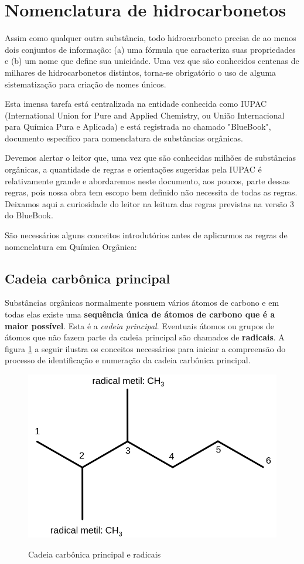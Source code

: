 \section{Nomenclatura de hidrocarbonetos}
Assim como qualquer outra substância, todo hidrocarboneto precisa de ao menos dois conjuntos de informação: (a) uma fórmula que caracteriza suas propriedades e (b) um nome que define sua unicidade. Uma vez que são conhecidos centenas de milhares de hidrocarbonetos distintos, torna-se obrigatório o uso de alguma sistematização para criação de nomes únicos.

Esta imensa tarefa está centralizada na entidade conhecida como IUPAC (International Union for Pure and Applied Chemistry, ou União Internacional para Química Pura e Aplicada) e está registrada no chamado "BlueBook", documento específico para nomenclatura de substâncias orgânicas.

Devemos alertar o leitor que, uma vez que são conhecidas milhões de substâncias orgânicas, a quantidade de regras e orientações sugeridas pela IUPAC é relativamente grande e abordaremos neste documento, aos poucos, parte dessas regras, pois nossa obra tem escopo bem definido não necessita de todas as regras. Deixamos aqui a curiosidade do leitor na leitura das regras previstas na versão 3 do BlueBook.

São necessários alguns conceitos introdutórios antes de aplicarmos as regras de nomenclatura em Química Orgânica:

\subsection{Cadeia carbônica principal}
Substâncias orgânicas normalmente possuem vários átomos de carbono e em todas elas existe uma \textbf{sequência única de átomos de carbono que é a maior possível}. Esta é a \emph{cadeia principal}. Eventuais átomos ou grupos de átomos que não fazem parte da cadeia principal são chamados de \textbf{radicais}. A figura \ref{fig:23} a seguir ilustra os conceitos necessários para iniciar a compreensão do processo de identificação e numeração da cadeia carbônica principal.

\begin{figure}[H]
	\centering
	\caption{Cadeia carbônica principal e radicais}
	\vspace{0.5cm}
	\includegraphics[width=0.75\linewidth]{imagens/23dimetil-hexano.png}
	\label{fig:23}
\end{figure}


